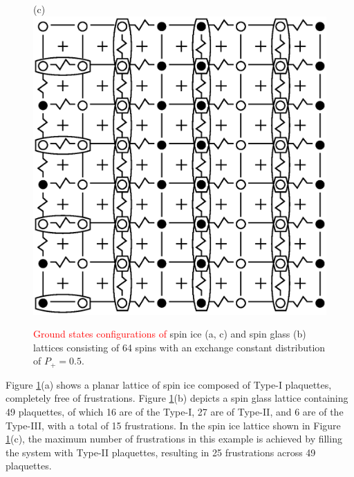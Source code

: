 \documentclass[preprint,12pt]{elsarticle}
\begin{document}
\begin{figure}[H]
\begin{minipage}[h]{0.3\linewidth}
		\end{minipage}
		\hfill
		\begin{minipage}[h]{0.3\linewidth}
			\centering(c)
			\includegraphics[width=1\linewidth]{pictures/SI_64_J0}
		\end{minipage}
		\hfill
		\caption{\textcolor{red}{Ground states configurations of} spin ice (a, c) and spin glass (b) lattices consisting of 64 spins with an exchange constant distribution of $P_+ = 0.5$.}
		\label{fig:cell_SI_SG_64}
		
	\end{figure}
	
	
	Figure \ref{fig:cell_SI_SG_64}(a) shows a planar lattice of spin ice composed of Type-I plaquettes, completely free of frustrations.
	Figure \ref{fig:cell_SI_SG_64}(b) depicts a spin glass lattice containing 49 plaquettes, of which 16 are of the Type-I, 27 are of Type-II, and 6 are of the Type-III, with a total of 15 frustrations.
	In the spin ice lattice shown in Figure \ref{fig:cell_SI_SG_64}(c), the maximum number of frustrations in this example is achieved by filling the system with Type-II plaquettes, resulting in 25 frustrations across 49 plaquettes.
	
\end{document}
